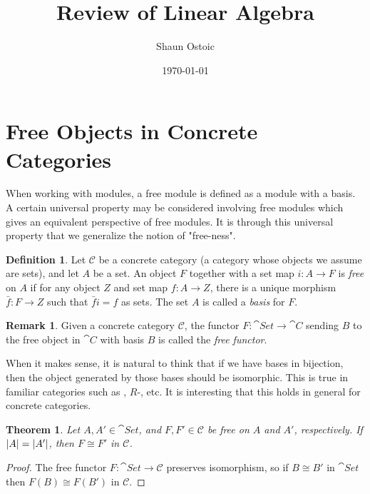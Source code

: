 \documentclass[12pt]{article}
\title{Review of Linear Algebra}
\author{Shaun Ostoic}
\date{\today}
\theoremstyle{definition}
\newtheorem{definition}{Definition}[section]
\newtheorem{remark}{Remark}[section]
\theoremstyle{plain}
\newtheorem{theorem}{Theorem}[section]
\numberwithin{equation}{section}
\theoremstyle{definition}
\begin{document}
\maketitle

\section{Free Objects in Concrete Categories}

When working with modules, a free module is defined as a module with a basis. A certain universal property may be considered involving free modules which gives an equivalent perspective of free modules. It is through this universal property that we generalize the notion of "free-ness". 

\begin{definition}
Let $\mathscr{C}$ be a concrete category (a category whose objects we assume are sets), and let $ A $ be a set. An object $ F $ together with a set map $ i : A \to F $ is \textit{free} on $ A $ if for any object $ Z $ and set map $ f : A \to Z $, there is a unique morphism $ \bar{f}: F \to Z $ such that $ \bar{f} i = f $ as sets. The set $ A $ is called a \textit{basis} for $ F $.
\end{definition}

\begin{remark}
Given a concrete category $ \mathscr{C} $, the functor $ F : \cat{Set} \to \cat{C}$ sending $ B $ to the free object in $ \cat{C} $ with basis $ B $ is called the \textit{free functor}.
\end{remark}

When it makes sense, it is natural to think that if we have bases in bijection, then the object generated by those bases should be isomorphic. This is true in familiar categories such as , $ R $-, etc. It is interesting that this holds in general for concrete categories.

\begin{theorem}
Let $ A, A' \in \cat{Set}$, and $ F,  F' \in \mathscr{C}$ be free on $ A$ and $ A' $, respectively. If $ |A| = |A'| $, then $ F \cong F' $ in $ \mathscr{C} $.
\end{theorem}

\begin{proof}
The free functor $ F : \cat{Set} \to \mathscr{C} $ preserves isomorphism, so if $ B \cong B' $ in $ \cat{Set} $ then $ F(B) \cong F(B') $ in $ \mathscr{C}$.
\end{proof}
\end{document}
